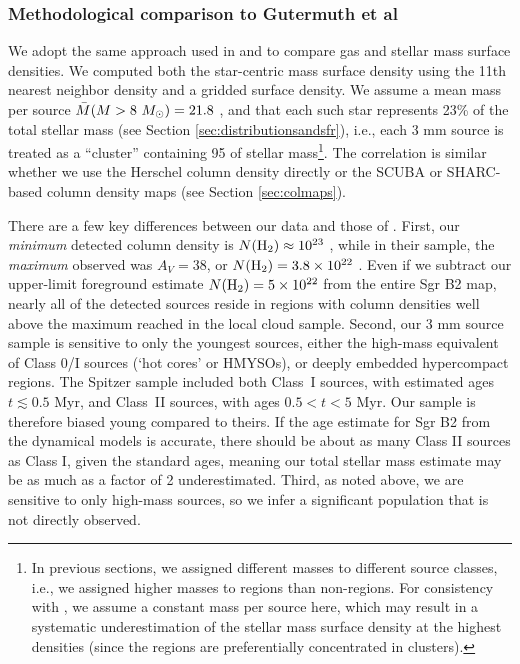 \documentclass[twocolumn]{aastex61}
\begin{document}
\subsubsection{Methodological comparison to Gutermuth et al}
\label{sec:gutermuthmethods}
We adopt the same approach used in \citet{Gutermuth2009a} and
\citet{Gutermuth2011a} to compare gas and stellar mass surface densities.  We
computed both the star-centric mass surface density using the 11th nearest
neighbor density and a gridded surface density.  We assume a mean mass per
source $\bar{M}(M>8~M_{\odot})=21.8$ \msun, and that each such star represents 23\%
of the total stellar mass (see Section \ref{sec:distributionsandsfr}), i.e.,
each 3 mm source is treated as a ``cluster'' containing 95 \msun of stellar
mass\footnote{In previous
sections, we assigned different masses to different source classes, i.e., we
assigned higher masses to \hii regions than non-\hii regions.  For consistency
with \citet{Gutermuth2011a}, we assume a constant mass per source here, which
may result in a systematic underestimation of the stellar mass surface density
at the highest densities (since the \hii regions are preferentially
concentrated in clusters).}. The correlation is similar whether we use the
Herschel column density directly or the SCUBA or SHARC-based column density
maps (see Section \ref{sec:colmaps}).  

There are a few key differences between our data and those of
\citet{Gutermuth2011a}.  First, our \emph{minimum} detected column density is
$N(\textrm{H}_{2})\approx10^{23}$ \persc, while in their sample, the \emph{maximum}
observed was $A_V=38$, or $N(\textrm{H}_{2})=3.8\times10^{22}$ \persc.  Even if we subtract our
upper-limit foreground estimate $N(\textrm{H}_{2})=5\times10^{22}$ \persc from the entire Sgr B2
map, nearly all of the detected sources reside in regions with column densities
well above the maximum reached in the local cloud sample.  Second, our 3 mm
source sample is sensitive to only the youngest sources, either the high-mass
equivalent of Class 0/I sources (`hot cores' or HMYSOs), or deeply embedded
hypercompact \hii regions.  The Spitzer sample included both Class~I sources,
with estimated ages $t\lesssim0.5$ Myr, and Class~II sources, with ages $0.5 <
t < 5$ Myr.  Our sample is therefore biased young compared to theirs.  If the
age estimate for Sgr B2 from the dynamical models
\citep{Kruijssen2015a} is accurate, there should be about as many
Class II sources as Class I, given the standard ages, meaning our total stellar
mass estimate may be as much as a factor of 2 underestimated.  Third, as noted
above, we are sensitive to only high-mass sources, so we infer a significant
population that is not directly observed.
\end{document}
